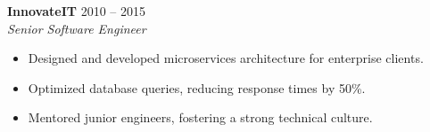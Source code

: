 \documentclass[a4paper,10pt]{article}
\begin{document}
\begin{minipage}[t]{0.65\textwidth}
    \vspace{0.5em}
    \textbf{InnovateIT} \hfill 2010 -- 2015\\
    \textit{Senior Software Engineer}\\
    \begin{itemize}[leftmargin=1.5em, nosep]
        \item Designed and developed microservices architecture for enterprise clients.
        \item Optimized database queries, reducing response times by 50\%.
        \item Mentored junior engineers, fostering a strong technical culture.
    \end{itemize}

\end{minipage}
\hfill
\end{document}
